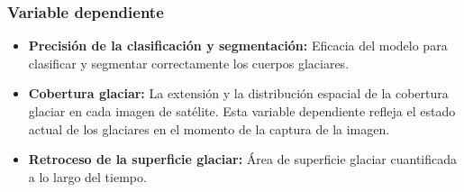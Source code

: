 \subsubsection{Variable dependiente}

\begin{itemize}
	\item \textbf{Precisión de la clasificación y segmentación:} Eficacia del modelo para clasificar y segmentar correctamente los cuerpos glaciares.
	
	\item \textbf{Cobertura glaciar:} La extensión y la distribución espacial de la cobertura glaciar en cada imagen de satélite. Esta variable dependiente refleja el estado actual de los glaciares en el momento de la captura de la imagen.
	
	\item \textbf{Retroceso de la superficie glaciar:} Área de superficie glaciar cuantificada a lo largo del tiempo.
	
\end{itemize}

